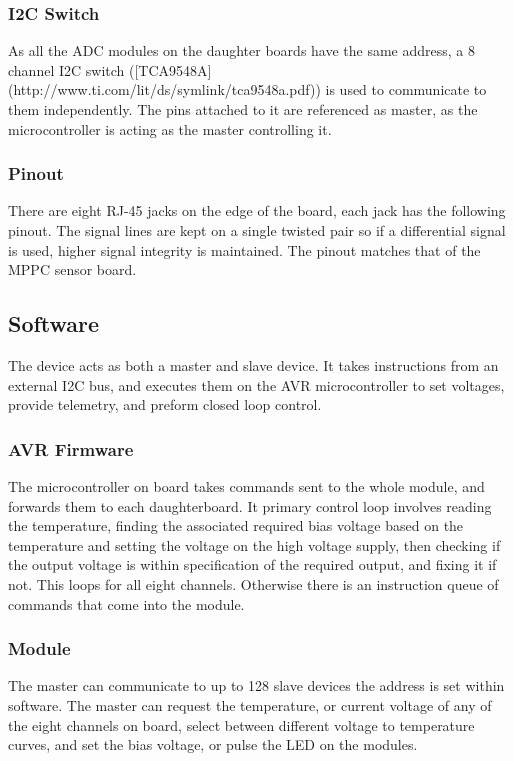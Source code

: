 
\subsubsection{I2C Switch}
As all the ADC modules on the daughter boards have the same address, a 8 channel I2C switch ([TCA9548A](http://www.ti.com/lit/ds/symlink/tca9548a.pdf)) is used to communicate to them independently. The pins attached to it are referenced as master, as the microcontroller is acting as the master controlling it.

\subsubsection{Pinout}
There are eight RJ-45 jacks on the edge of the board, each jack has the following pinout. The signal lines are kept on a single twisted pair so if a differential signal is used, higher signal integrity is maintained. The pinout matches that of the MPPC sensor board.


\subsection{Software}
The device acts as both a master and slave device. It takes instructions from an external I2C bus, and executes them on the AVR microcontroller to set voltages, provide telemetry, and preform closed loop control.

\subsubsection{AVR Firmware}
The microcontroller on board takes commands sent to the whole module, and forwards them to each daughterboard. It primary control loop involves reading the temperature, finding the associated required bias voltage based on the temperature and setting the voltage on the high voltage supply, then checking if the output voltage is within specification of the required output, and fixing it if not. This loops for all eight channels. Otherwise there is an instruction queue of commands that come into the module.

\subsubsection{Module}
The master can communicate to up to 128 slave devices the address is set within software. The master can request the temperature, or current voltage of any of the eight channels on board, select between different voltage to temperature curves, and set the bias voltage, or pulse the LED on the modules.

\pagebreak
